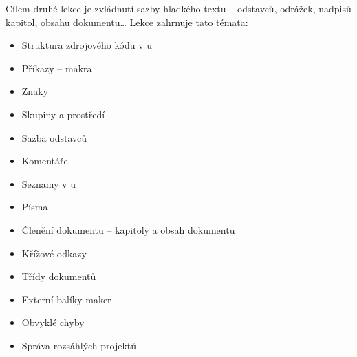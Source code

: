 {
	Cílem druhé lekce je zvládnutí sazby hladkého textu -- odstavců, odrážek, nadpisů kapitol, obsahu dokumentu\ldots{} Lekce zahrnuje tato témata:
	\begin{itemize}
		\item Struktura zdrojového kódu v u
		\item Příkazy -- makra
		\item Znaky
		\item Skupiny a prostředí
		\item Sazba odstavců
		\item Komentáře
		\item Seznamy v u
		\item Písma
		\item Členění dokumentu -- kapitoly a obsah dokumentu
		\item Křížové odkazy
		\item Třídy dokumentů
		\item Externí balíky maker
		\item Obvyklé chyby
		\item Správa rozsáhlých projektů
	\end{itemize}
}
\endinput
